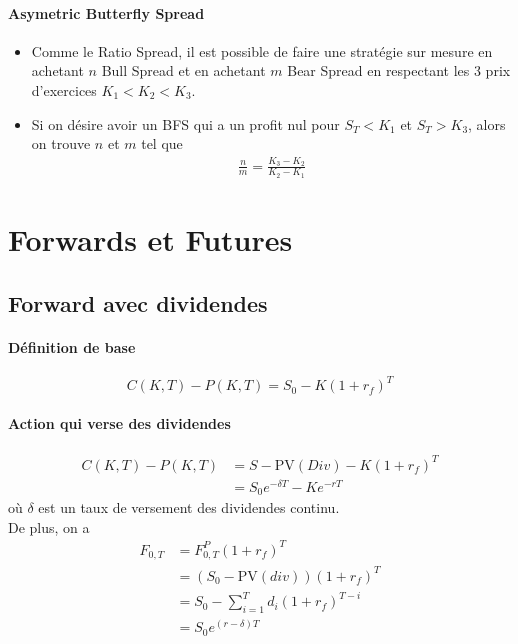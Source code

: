 \documentclass[10pt, french]{article}
\begin{document}
\begin{multicols*}{2}
\paragraph{Asymetric Butterfly Spread} 
\begin{itemize}
\item Comme le Ratio Spread, il est possible de faire une stratégie sur mesure en achetant $n$ Bull Spread et en achetant $m$ Bear Spread en respectant les 3 prix d'exercices $K_1 < K_2 < K_3$.
\item Si on désire avoir un BFS qui a un profit nul pour $S_T < K_1$ et $S_T > K_3$, alors on trouve $n$ et $m$ tel que
\begin{align*}
\frac{n}{m} = \frac{K_3 - K_2}{K_2 - K_1}
\end{align*}
\end{itemize}

\setcounter{section}{4}
\section{Forwards et Futures}
\subsection*{Forward avec dividendes}
\paragraph{Définition de base}
\[C(K,T) - P(K,T) = S_0 - K(1+r_f)^{T}\]

\paragraph{Action qui verse des dividendes}
\begin{align*}
C(K,T) - P(K,T) 		& = S - \text{PV}(Div) - K(1 + r_f)^{T} \\
& = S_0 e^{-\delta T} - K e^{-rT}
\end{align*}
où $\delta$ est un taux de versement des dividendes continu. \\

De plus, on a
\begin{align*}
F_{0,T} & = F_{0,T}^{P} (1 + r_f)^{T} \\
& = (S_0 - \text{PV}(div))(1+r_f)^{T} \\
& = S_0 - \sum_{i=1}^{T} d_i (1+r_f)^{T-i} \\
& = S_0 e^{(r-\delta)T}
\end{align*}


\end{multicols*}
\end{document}
